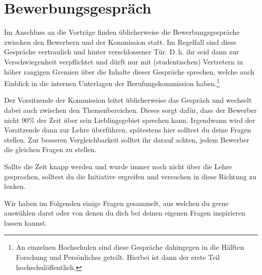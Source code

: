 \section{Bewerbungsgespräch}
Im Anschluss an die Vorträge finden üblicherweise die Bewerbungsgespräche zwischen den Bewerbern und der Kommission statt. Im Regelfall sind diese Gespräche vertraulich und hinter verschlossener Tür. D.\,h. ihr seid dann zur Verschwiegenheit verpflichtet und dürft nur mit (studentischen) Vertretern in höher rangigen Gremien über die Inhalte dieser Gespräche sprechen, welche auch Einblick in die internen Unterlagen der Berufungskommission haben.\footnote{An einzelnen Hochschulen sind diese Gespräche dahingegen in die Hälften Forschung und Persönliches geteilt. Hierbei ist dann der erste Teil hochschulöffentlich.}

Der Vorsitzende der Kommission leitet üblicherweise das Gespräch und wechselt dabei auch zwischen den Themenbereichen. Dieses sorgt dafür, dass der Bewerber nicht 90\% der Zeit über sein Lieblingsgebiet sprechen kann. Irgendwann wird der Vorsitzende dann zur Lehre überführen, spätestens hier solltest du deine Fragen stellen. Zur besseren Vergleichbarkeit solltet ihr darauf achten, jedem Bewerber die gleichen Fragen zu stellen.

Sollte die Zeit knapp werden und wurde immer noch nicht über die Lehre gesprochen, solltest du die Initiative ergreifen und versuchen in diese Richtung zu lenken.

Wir haben im Folgenden einige Fragen gesammelt, aus welchen du gerne auswählen darst oder von denen du dich bei deinen eigenen Fragen inspirieren lassen kannst.

